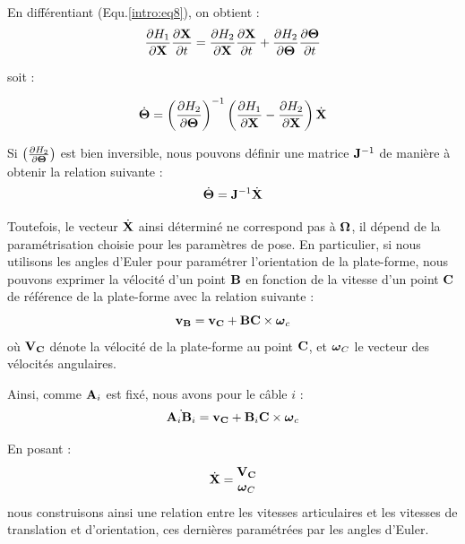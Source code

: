 En différentiant (Equ.\ref{intro:eq8}), on obtient :
\begin{equation}
\frac{\partial H_1}{\partial {\bf X}} \frac{\partial {\bf X}}{\partial t} 
=  \frac{\partial H_2}{\partial {\bf X}} \frac{\partial {\bf X}}{\partial t} + 
\frac{\partial H_2}{\partial {\bf \Theta}} \frac{\partial {\bf 
\Theta}}{\partial t}
\label{intro:eq9}
\end{equation}

soit :

\begin{equation}
\dot {\bf \Theta} = \left ( \frac{\partial H_2}{\partial {\bf \Theta}} \right 
)^{-1} \left (\frac{\partial H_1}{\partial {\bf X}} - \frac{\partial 
H_2}{\partial {\bf X}} \right ) \dot {\bf X}
\label{intro:eq10}
\end{equation}

Si $\left ( \frac{\partial H_2}{\partial {\bf \Theta}} \right )$ est bien 
inversible, nous pouvons définir une matrice ${\bf J}^{-1}$ de manière à 
obtenir la 
relation suivante :
\begin{equation}
\dot {\bf \Theta} = {\bf J}^{-1} \dot {\bf X}
\label{intro:eq11}
\end{equation}

Toutefois, le vecteur $\dot {\bf X}$ ainsi d\'etermin\'e ne correspond pas \`a 
$\bf \Omega$, il d\'epend de la param\'etrisation choisie pour les param\`etres 
de pose. En particulier, si nous utilisons les angles d'Euler pour param\'etrer 
l'orientation de la plate-forme, nous pouvons exprimer la v\'elocit\'e d'un 
point ${\bf B}$ en fonction de la vitesse d'un point ${\bf C}$ de r\'ef\'erence 
de la plate-forme avec la relation suivante :
\begin{equation}
{\bf v_B} = {\bf v_C} + {\bf BC} \times {\hbox{\boldmath $\omega$}_c}
\label{intro:eq11b}
\end{equation}
o\`u $\bf V_C$ d\'enote la v\'elocit\'e de la plate-forme au point ${\bf C}$, 
et ${\hbox{\boldmath $\omega$}_C}$ le vecteur des v\'elocit\'es angulaires.

Ainsi, comme ${\bf A}_i$ est fix\'e, nous avons pour le c\^able $i$ :
\begin{equation}
\dot { {\bf A}_i{\bf B}_i } = {\bf v_C} + {\bf B}_i{\bf C} \times {\hbox{\boldmath $\omega$}_c}
\label{intro:eq11c}
\end{equation}

En posant :
\begin{equation}
\dot {\bf X} = \begin{matrix}
                {\bf V_C} \\
		{\hbox{\boldmath $\omega$}_C}
               \end{matrix}
\label{intro:eq11d}
\end{equation}
nous construisons ainsi une relation entre les vitesses articulaires et les 
vitesses de translation et d'orientation, ces derni\`eres param\'etr\'ees par 
les angles d'Euler.

